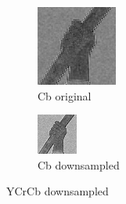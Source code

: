 \begin{figure}[H]
    \medskip

    \begin{subfigure}[t]{0.4\textwidth}
        \centering
        \includegraphics[width=\linewidth]{src/assets/tests/Cb_zoom.png}
        \caption{Cb original}
        \label{fig:tests-Cb-original}
    \end{subfigure}
    \hfill
    \begin{subfigure}[t]{0.4\textwidth}
        \centering
        \includegraphics[width=\linewidth]{src/assets/tests/Cb_downsampled_zoom.png}
        \caption{Cb downsampled}
        \label{fig:tests-Cb-downsampled}
    \end{subfigure}


    \caption{YCrCb downsampled}
    \label{fig:tests-yuv-downsampled}
\end{figure}

